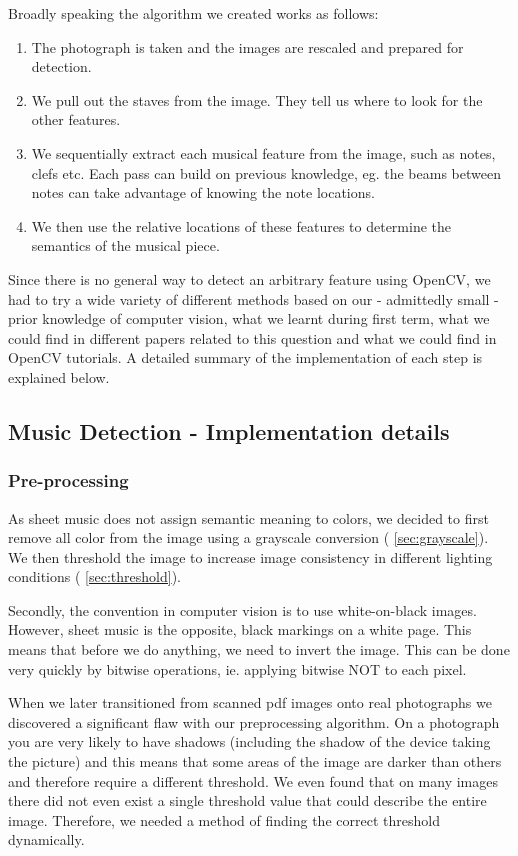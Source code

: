 Broadly speaking the algorithm we created works as follows: 

\begin{enumerate}
\item{The photograph is taken and the images are rescaled and prepared for detection.}
\item{We pull out the staves from the image. They tell us where to look for the other features.}
\item{We sequentially extract each musical feature from the image, such as notes, clefs etc. Each pass can build on previous knowledge, eg. the beams between notes can take advantage of knowing the note locations.}
\item{We then use the relative locations of these features to determine the semantics of the musical piece.}
\end{enumerate}

Since there is no general way to detect an arbitrary feature using OpenCV, we had to try a wide variety of different methods based on our - admittedly small - prior knowledge of computer vision, what we learnt during first term, what we could find in different papers related to this question and what we could find in OpenCV tutorials. A detailed summary of the implementation of each step is explained below.

\subsection{Music Detection - Implementation details}

\subsubsection{Pre-processing}

As sheet music does not assign semantic meaning to colors, we decided to first remove all color from the image using a grayscale conversion ( \autoref{sec:grayscale}). We then threshold the image to increase image consistency in different lighting conditions ( \autoref{sec:threshold}). 

Secondly, the convention in computer vision is to use white-on-black images. However, sheet music is the opposite, black markings on a white page. This means that before we do anything, we need to invert the image. This can be done very quickly by bitwise operations, ie. applying bitwise NOT to each pixel.

When we later transitioned from scanned pdf images onto real photographs we discovered a significant flaw with our preprocessing algorithm. On a photograph you are very likely to have shadows (including the shadow of the device taking the picture) and this means that some areas of the image are darker than others and therefore require a different threshold. We even found that on many images there did not even exist a single threshold value that could describe the entire
image. Therefore, we needed a method of finding the correct threshold dynamically.

